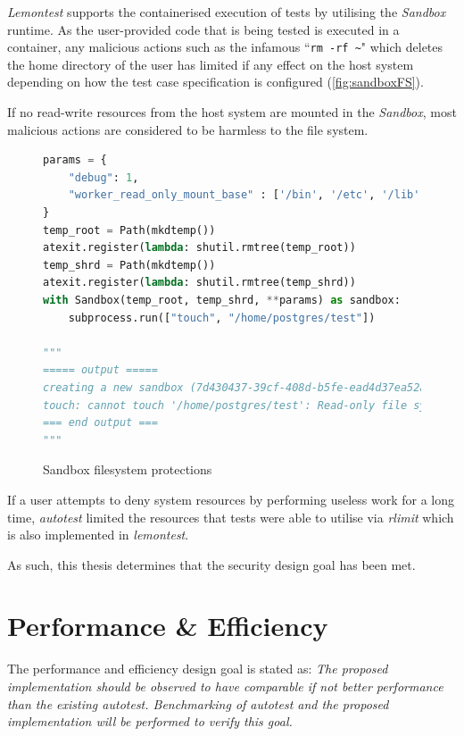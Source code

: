 \documentclass[hidelinks]{report}
\begin{document}
\textit{Lemontest} supports the containerised execution of tests by utilising the \textit{Sandbox} runtime. As the user-provided code that is being tested is executed in a container, any malicious actions such as the infamous ``\lstinline|rm -rf ~|" which deletes the home directory of the user has limited if any effect on the host system depending on how the test case specification is configured (\autoref{fig:sandboxFS}).

If no read-write resources from the host system are mounted in the \textit{Sandbox}, most malicious actions are considered to be harmless to the file system.
\begin{figure}[h]
	\centering
	\begin{lstlisting}[language=python, breaklines=true, linewidth=\linewidth, tabsize=4]
params = {
    "debug": 1,
    "worker_read_only_mount_base" : ['/bin', '/etc', '/lib', '/lib32', '/lib64', '/libx32', '/sbin', '/usr', '/home']
}
temp_root = Path(mkdtemp())
atexit.register(lambda: shutil.rmtree(temp_root))
temp_shrd = Path(mkdtemp())
atexit.register(lambda: shutil.rmtree(temp_shrd))
with Sandbox(temp_root, temp_shrd, **params) as sandbox:
    subprocess.run(["touch", "/home/postgres/test"])

"""
===== output =====
creating a new sandbox (7d430437-39cf-408d-b5fe-ead4d37ea52a)
touch: cannot touch '/home/postgres/test': Read-only file system
=== end output ===
"""
	\end{lstlisting}
	\caption{Sandbox filesystem protections}
	\label{fig:sandboxFS}
\end{figure}

If a user attempts to deny system resources by performing useless work for a long time, \textit{autotest} limited the resources that tests were able to utilise via \textit{rlimit} which is also implemented in \textit{lemontest}.

As such, this thesis determines that the security design goal has been met.

\clearpage
\section{Performance \& Efficiency}
The performance and efficiency design goal is stated as: \textit{The proposed implementation should be observed to have comparable if not better performance than the existing autotest. Benchmarking of autotest and the proposed implementation will be performed to verify this goal.}
\end{document}
